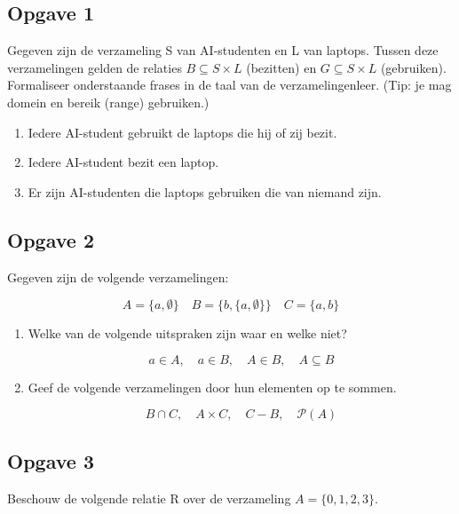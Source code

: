 \documentclass[11pt]{article}
\begin{document}

\subsection*{Opgave 1}
Gegeven zijn de verzameling S van AI-studenten en L van laptops. Tussen deze verzamelingen gelden de relaties $B \subseteq S \times L$ (bezitten) en $G \subseteq S \times L$ (gebruiken). Formaliseer onderstaande frases in de taal van de verzamelingenleer. (Tip: je mag domein en bereik (range) gebruiken.)

\begin{enumerate}[label=\alph*]

  \item Iedere AI-student gebruikt de laptops die hij of zij bezit.

  \item Iedere AI-student bezit een laptop.

  \item Er zijn AI-studenten die laptops gebruiken die van niemand zijn.

\end{enumerate}


\subsection*{Opgave 2}
Gegeven zijn de volgende verzamelingen:

\[ A=\{a, \emptyset\} \quad B=\{b, \{a,\emptyset\}\} \quad C=\{a, b\}\]

\begin{enumerate}[label=\alph*]

  \item Welke van de volgende uitspraken zijn waar en welke niet?

        \[ a \in A, \quad a \in B, \quad A \in B, \quad A \subseteq B\]

  \item Geef de volgende verzamelingen door hun elementen op te sommen.

		\[ B \cap C, \quad A \times C, \quad C-B, \quad \mathcal{P}(A)\]

\end{enumerate}


\subsection*{Opgave 3}
Beschouw de volgende relatie R over de verzameling $A = \{0, 1, 2, 3\}$.
\end{document}
